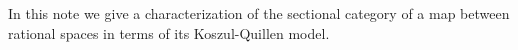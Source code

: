 In this note we give a characterization of the sectional category of a map between rational spaces in terms of its Koszul-Quillen model.